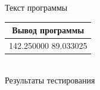 \documentclass[a4paper,14pt]{extarticle}
\begin{document}

\begin{center}
Текст программы\\
\vspace{0.6cm}
\begin{tabular}{|l|}
\hline
\multicolumn{1}{|c|}{Вывод программы}\\
\hline
142.250000 89.033025 \\
\hline
\end{tabular}\\
\vspace{0.3cm}
Результаты тестирования
\end{center}
\end{document}
